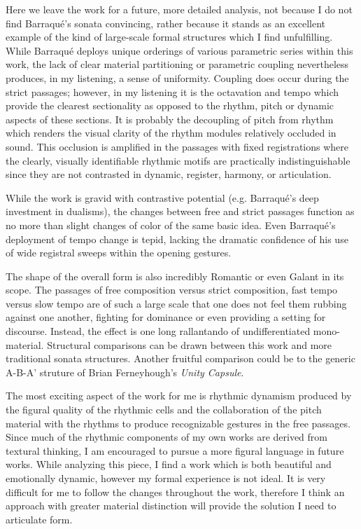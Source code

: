 Here we leave the work for a future, more detailed analysis, not because I do not find Barraqué's sonata convincing, rather because it stands as an excellent example of the kind of large-scale formal structures which I find unfulfilling. While Barraqué deploys unique orderings of various parametric series within this work, the lack of clear material partitioning or parametric coupling nevertheless produces, in my listening, a sense of uniformity. Coupling does occur during the strict passages; however, in my listening it is the octavation and tempo which provide the clearest sectionality as opposed to the rhythm, pitch or dynamic aspects of these sections. It is probably the decoupling of pitch from rhythm which renders the visual clarity of the rhythm modules relatively occluded in sound. This occlusion is amplified in the passages with fixed registrations where the clearly, visually identifiable rhythmic motifs are practically indistinguishable since they are not contrasted in dynamic, register, harmony, or articulation.

While the work is gravid with contrastive potential (e.g. Barraqué's deep investment in dualisms), the changes between free and strict passages function as no more than slight changes of color of the same basic idea. Even Barraqué's deployment of tempo change is tepid, lacking the dramatic confidence of his use of wide registral sweeps within the opening gestures.%

The shape of the overall form is also incredibly Romantic or even Galant in its scope. The passages of free composition versus strict composition, fast tempo versus slow tempo are of such a large scale that one does not feel them rubbing against one another, fighting for dominance or even providing a setting for discourse. Instead, the effect is one long rallantando of undifferentiated mono-material. Structural comparisons can be drawn between this work and more traditional sonata structures. Another fruitful comparison could be to the generic A-B-A' struture of Brian Ferneyhough's \textit{Unity Capsule}.

The most exciting aspect of the work for me is rhythmic dynamism produced by the figural quality of the rhythmic cells and the collaboration of the pitch material with the rhythms to produce recognizable gestures in the free passages. Since much of the rhythmic components of my own works are derived from textural thinking, I am encouraged to pursue a more figural language in future works. While analyzing this piece, I find a work which is both beautiful and emotionally dynamic, however my formal experience is not ideal. It is very difficult for me to follow the changes throughout the work, therefore I think an approach with greater material distinction will provide the solution I need to articulate form.


